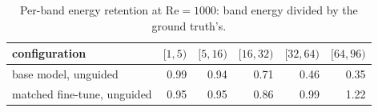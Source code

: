\begin{table}[t]
  \centering
  \caption{Per-band energy retention at $\mathrm{Re}=1000$: band energy divided by the ground truth's.}
  \label{tab:re1000-perband-ret}
  \begin{tabular}{lrrrrr}
    \toprule
    configuration & $[1,5)$ & $[5,16)$ & $[16,32)$ & $[32,64)$ & $[64,96)$ \\
    \midrule
    base model, unguided & 0.99 & 0.94 & 0.71 & 0.46 & 0.35 \\
    matched fine-tune, unguided & 0.95 & 0.95 & 0.86 & 0.99 & 1.22 \\
    \bottomrule
  \end{tabular}
\end{table}
